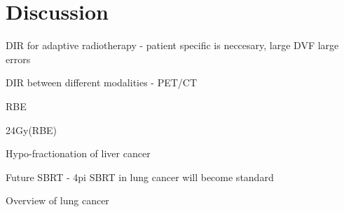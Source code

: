 \documentclass[type=dr, dr=rernat, accentcolor=tud7b,colorbacktitle, bigchapter, openright, twoside, 12pt ]{tudthesis}
\begin{document}
\chapter{Discussion}



DIR for adaptive radiotherapy - patient specific is neccesary, large DVF large errors %

DIR between different modalities - PET/CT %

RBE

24Gy(RBE) %

Hypo-fractionation of liver cancer %

Future SBRT - 4pi %
SBRT in lung cancer will become standard 

Overview of lung cancer %


{}
% 
\end{document}
